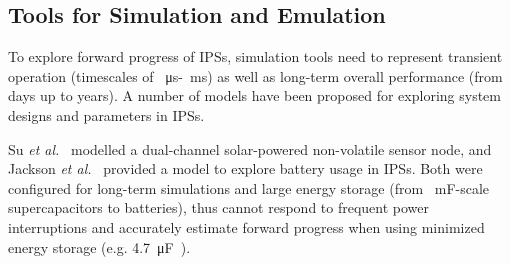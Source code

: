 



\subsection{Tools for Simulation and Emulation} \label{ssec:c2_tools}

To explore forward progress of IPSs, simulation tools need to represent transient operation (timescales of \SI{}{\micro\second}-\SI{}{\milli\second}) as well as long-term overall performance (from days up to years). 
A number of models have been proposed for exploring system designs and parameters in IPSs.

Su \textit{et al.}~\cite{Su:2019:TFR:3340300.3320270} modelled a dual-channel solar-powered non-volatile sensor node, and Jackson \textit{et al.}~\cite{Jackson:2019:COC:3302506.3310400} provided a model to explore battery usage in IPSs. 
Both were configured for long-term simulations and large energy storage (from \SI{}{\milli\farad}-scale supercapacitors to batteries), thus cannot respond to frequent power interruptions and accurately estimate forward progress when using minimized energy storage (e.g. \SI{4.7}{\micro\farad}~\cite{10.1145/3281300}).

